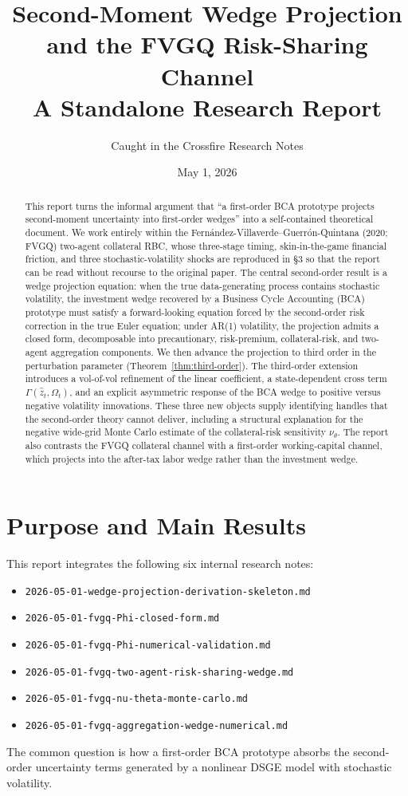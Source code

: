 \documentclass[11pt]{article}
\title{Second-Moment Wedge Projection and the FVGQ Risk-Sharing Channel\\
\large A Standalone Research Report}
\author{Caught in the Crossfire Research Notes}
\date{May 1, 2026}
\theoremstyle{plain}
\theoremstyle{definition}
\begin{document}
\maketitle

\begin{abstract}
This report turns the informal argument that ``a first-order BCA prototype
projects second-moment uncertainty into first-order wedges'' into a
self-contained theoretical document. We work entirely within the
Fern\'andez-Villaverde--Guerr\'on-Quintana (2020; FVGQ) two-agent collateral
RBC, whose three-stage timing, skin-in-the-game financial friction, and three
stochastic-volatility shocks are reproduced in §3 so that the report can be
read without recourse to the original paper. The central second-order result
is a wedge projection equation: when the true data-generating process contains
stochastic volatility, the investment wedge recovered by a Business Cycle
Accounting (BCA) prototype must satisfy a forward-looking equation forced by
the second-order risk correction in the true Euler equation; under AR(1)
volatility, the projection admits a closed form, decomposable into
precautionary, risk-premium, collateral-risk, and two-agent aggregation
components. We then advance the projection to third order in the perturbation
parameter (Theorem~\ref{thm:third-order}). The third-order extension
introduces a vol-of-vol refinement of the linear coefficient, a state-dependent
cross term $\Gamma(\hat z_t,\Omega_t)$, and an explicit asymmetric response of
the BCA wedge to positive versus negative volatility innovations. These three
new objects supply identifying handles that the second-order theory cannot
deliver, including a structural explanation for the negative wide-grid Monte
Carlo estimate of the collateral-risk sensitivity $\nu_\theta$. The report
also contrasts the FVGQ collateral channel with a first-order working-capital
channel, which projects into the after-tax labor wedge rather than the
investment wedge.
\end{abstract}

\tableofcontents
\clearpage

\section{Purpose and Main Results}

This report integrates the following six internal research notes:
\begin{itemize}
  \item \texttt{2026-05-01-wedge-projection-derivation-skeleton.md}
  \item \texttt{2026-05-01-fvgq-Phi-closed-form.md}
  \item \texttt{2026-05-01-fvgq-Phi-numerical-validation.md}
  \item \texttt{2026-05-01-fvgq-two-agent-risk-sharing-wedge.md}
  \item \texttt{2026-05-01-fvgq-nu-theta-monte-carlo.md}
  \item \texttt{2026-05-01-fvgq-aggregation-wedge-numerical.md}
\end{itemize}
The common question is how a first-order BCA prototype absorbs the
second-order uncertainty terms generated by a nonlinear DSGE model with
stochastic volatility.
\end{document}

